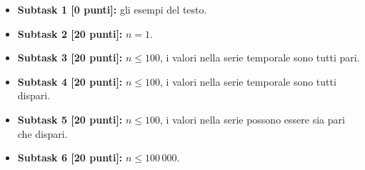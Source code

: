 \Scoring
\begin{itemize}
  \item \textbf{Subtask 1 [0 punti]:} gli esempi del testo.
  \item \textbf{Subtask 2 [20 punti]:} $n = 1$.
  \item \textbf{Subtask 3 [20 punti]:} $n \leq 100$, i valori nella serie temporale sono tutti pari.
  \item \textbf{Subtask 4 [20 punti]:} $n \leq 100$, i valori nella serie temporale sono tutti dispari.
  \item \textbf{Subtask 5 [20 punti]:} $n \leq 100$, i valori nella serie possono essere sia pari che dispari.
  \item \textbf{Subtask 6 [20 punti]:} $n \leq 100\,000$.
\end{itemize}
  
